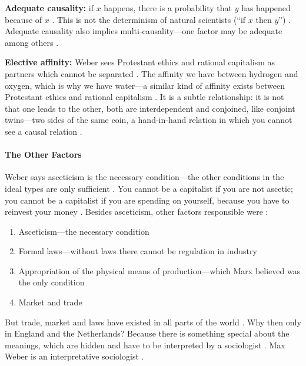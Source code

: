 \begin{KeyConcept}
\textbf{Adequate causality:} if $x$ happens, there is a probability that $y$ has happened because of $x$ . This is not the determinism of natural scientists (``if $x$ then $y$'') . Adequate causality also implies multi-causality---one factor may be adequate among others .

\textbf{Elective affinity:} Weber sees Protestant ethics and rational capitalism as partners which cannot be separated . The affinity we have between hydrogen and oxygen, which is why we have water---a similar kind of affinity exists between Protestant ethics and rational capitalism .
It is a subtle relationship: it is not that one leads to the other, both are interdependent and conjoined, like conjoint twins---two sides of the same coin, a hand-in-hand relation in which you cannot see a causal relation .
\end{KeyConcept}

\paragraph{The Other Factors}
Weber says asceticism is the necessary condition---the other conditions in the ideal types are only sufficient . You cannot be a capitalist if you are not ascetic; you cannot be a capitalist if you are spending on yourself, because you have to reinvest your money . Besides asceticism, other factors responsible were :
\begin{enumerate}
    \item Asceticism---the necessary condition 
    \item Formal laws---without laws there cannot be regulation in industry 
    \item Appropriation of the physical means of production---which Marx believed was the only condition 
    \item Market and trade 
\end{enumerate}

\begin{CriticalPoint}
But trade, market and laws have existed in all parts of the world . Why then only in England and the Netherlands? Because there is something special about the meanings, which are hidden and have to be interpreted by a sociologist . Max Weber is an interpretative sociologist .
\end{CriticalPoint}

